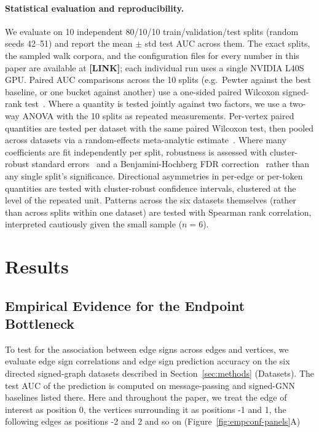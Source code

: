 \documentclass[sigconf, review, anonymous]{acmart}
\newcommand{\ph}[1]{\textbf{[#1]}} %
\theoremstyle{plain}
\theoremstyle{definition}
\begin{document}
\paragraph{Statistical evaluation and reproducibility.} We evaluate on 10 independent 80/10/10 train/validation/test splits (random seeds 42--51) and report the mean $\pm$ std test AUC across them. The exact splits, the sampled walk corpora, and the configuration files for every number in this paper are available at \ph{LINK}; each individual run uses a single NVIDIA L40S GPU. Paired AUC comparisons across the 10 splits (e.g.\ Pewter against the best baseline, or one bucket against another) use a one-sided paired Wilcoxon signed-rank test~\citep{wilcoxon1945individual}. Where a quantity is tested jointly against two factors, we use a two-way ANOVA with the 10 splits as repeated measurements. Per-vertex paired quantities are tested per dataset with the same paired Wilcoxon test, then pooled across datasets via a random-effects meta-analytic estimate~\citep{dersimonian1986meta}. Where many coefficients are fit independently per split, robustness is assessed with cluster-robust standard errors~\citep{cameron2011robust} and a Benjamini-Hochberg FDR correction~\citep{benjamini1995controlling} rather than any single split's significance. Directional asymmetries in per-edge or per-token quantities are tested with cluster-robust confidence intervals, clustered at the level of the repeated unit. Patterns across the six datasets themselves (rather than across splits within one dataset) are tested with Spearman rank correlation, interpreted cautiously given the small sample ($n=6$).

\section{Results}

\subsection{Empirical Evidence for the Endpoint Bottleneck}
\label{sec:empconf}
To test for the association between edge signs across edges and vertices,  we evaluate edge sign correlations and edge sign prediction accuracy on the six directed signed-graph datasets described in Section~\ref{sec:methods} (Datasets). The test AUC of the prediction is computed on message-passing and signed-GNN baselines listed there. Here and throughout the paper, we treat the edge of interest as position 0, the vertices surrounding it as positions -1 and 1, the following edges as positions -2 and 2 and so on (Figure~\ref{fig:empconf-panels}A)
\end{document}
